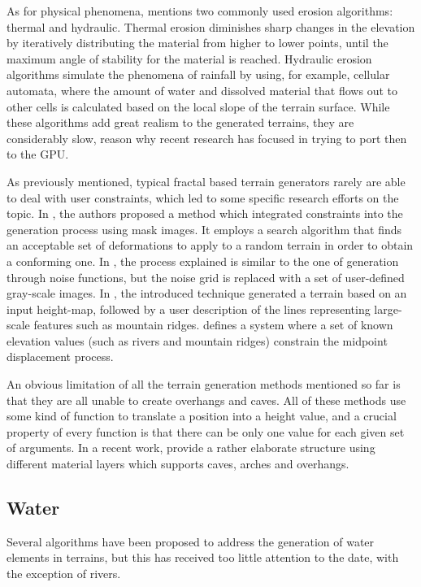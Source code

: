 \documentclass{acmtog}
\begin{document}
As for physical phenomena, \cite{Olsen04} mentions two commonly used erosion algorithms: thermal and hydraulic. Thermal erosion diminishes sharp changes in the elevation by iteratively distributing the material from higher to lower points, until the maximum angle of stability for the material is reached. Hydraulic erosion algorithms simulate the phenomena of rainfall by using, for example, cellular automata, where the amount of water and dissolved material that flows out to other cells is calculated based on the local slope of the terrain surface. While these algorithms add great realism to the generated terrains, they are considerably slow, reason why recent research has focused in trying to port then to the GPU.

As previously mentioned, typical fractal based terrain generators rarely are able to deal with user constraints, which led to some specific research efforts on the topic. In \cite{Stachniak05}, the authors proposed a method which integrated constraints into the generation process using mask images. It employs a search algorithm that finds an acceptable set of deformations to apply to a random terrain in order to obtain a conforming one. In \cite{Schneider06}, the process explained is similar to the one of generation through noise functions, but the noise grid is replaced with a set of user-defined gray-scale images. In \cite{Zhou07}, the introduced technique generated a terrain based on an input height-map, followed by a user description of the lines representing large-scale features such as mountain ridges. \cite{Belhadj07} defines a system where a set of known elevation values (such as rivers and mountain ridges) constrain the midpoint displacement process.

An obvious limitation of all the terrain generation methods mentioned so far is that they are all unable to create overhangs and caves. All of these methods use some kind of function to translate a position into a height value, and a crucial property of every function is that there can be only one value for each given set of arguments. In a recent work, \cite{Peytavie09} provide a rather elaborate structure using different material layers which supports caves, arches and overhangs.

\subsection{Water}
Several algorithms have been proposed to address the generation of water elements in terrains, but this has received too little attention to the date, with the exception of rivers.
\end{document}
